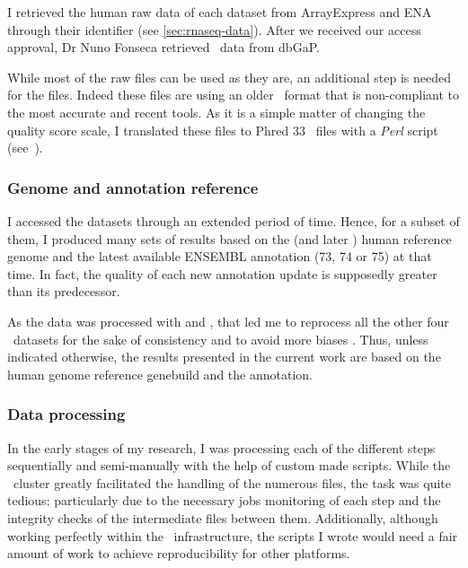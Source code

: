 I retrieved the human raw data of each dataset from \gls{ArrayExpress} and
\gls{ENA} through their identifier (see \cref{sec:rnaseq-data}). After we
received our access approval, Dr Nuno Fonseca retrieved \Gtex\ data from
\gls{dbGaP}.

While most of the raw files can be used as they are, an additional step is
needed for the  files. Indeed these files are using an older
\fastq\ format that is non-compliant to the most accurate and recent tools.
As it is a simple matter of changing the quality score scale,
I translated these files to \gls{Phred} $33$ \fastq\ files with a
\emph{\gls{Perl}} script (see~).

\subsubsection{Genome and annotation reference}

I accessed the datasets through an extended period of time. Hence, for a subset of
them, I produced many sets of results based on the 
(and later )  human reference genome and the latest available ENSEMBL
annotation (73, 74 or 75) at that time.
In fact, the quality of each new annotation update is
supposedly greater than its predecessor.

As the  data was processed with  and , that led me
to reprocess all the other four \Rnaseq\ datasets for the sake of consistency and
to avoid more biases \citep{h38vsh37}. Thus, unless indicated
otherwise, the results presented in the current work are
based on the  human genome reference genebuild and the 
annotation.


\subsubsection{Data processing}

In the early stages of my research, I was processing each of the different steps
sequentially and semi-manually with the help of custom made scripts. While the
\EBI\ \gls{cluster} greatly facilitated the handling of the numerous files,
the task was quite tedious: particularly due to the necessary jobs monitoring of
each step and the integrity checks of the intermediate files between them.
Additionally, although working perfectly within the \EBI\ infrastructure,
the scripts I wrote would need a fair amount of work to achieve reproducibility
for other platforms.

